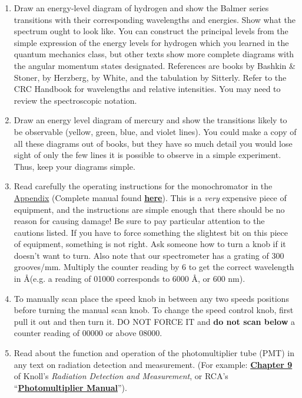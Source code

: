 \documentclass{../lab}
\begin{document}
\begin{enumerate}
    \item Draw an energy-level diagram of hydrogen and show the Balmer series transitions with their corresponding wavelengths and energies. Show what the spectrum ought to look like. You can construct the principal levels from the simple expression of the energy levels for hydrogen which you learned in the quantum mechanics class, but other texts show more complete diagrams with the angular momentum states designated. References are books by Bashkin \& Stoner, by Herzberg, by White, and the tabulation by Sitterly. Refer to the CRC Handbook for wavelengths and relative intensities. You may need to review the spectroscopic notation.

    \item Draw an energy level diagram of mercury and show the transitions likely to be observable (yellow, green, blue, and violet lines).
	You could make a copy of all these diagrams out of books, but they have so much detail you would lose sight of only the few lines it is possible to observe in a simple experiment. Thus, keep your diagrams simple.

    \item Read carefully the operating instructions for the monochromator in the \hyperref[sec:Appendix]{ Appendix}
    (Complete manual found \href{https://drive.google.com/file/d/1qrGTtcw9cd7z8blat9n5xlo_y_Rtyrm6/view?usp=drive_link}{\textbf{here}}). This is a \emph{very} expensive piece of equipment, and the instructions are simple enough that there should be no reason for causing damage! Be sure to pay particular attention to the cautions listed. If you have to force something the slightest bit on this piece of equipment, something is not right. Ask someone how to turn a knob if it doesn't want to turn. Also note that our spectrometer has a grating of 300 grooves/mm. Multiply the counter reading by 6 to get the correct wavelength in \AA (e.g. a reading of 01000 corresponds to 6000 \AA, or 600 nm).

    \item To manually scan place the speed knob in between any two speeds positions before turning the manual scan knob. To change the speed control knob, first pull it out and then turn it. DO NOT FORCE IT and \textbf{do not scan below} a counter reading of 00000 or above 08000.

    \item Read about the function and operation of the photomultiplier tube (PMT) in any text on radiation detection and measurement. (For example:  \href{https://drive.google.com/file/d/1SoVP6jmWYZIQK9NuvwGr-_TFffYuJ3Q4/view?usp=drive_link} {\textbf{Chapter 9}} of Knoll's \emph{Radiation Detection and Measurement}, or RCA's ``\href{https://drive.google.com/file/d/1zl5AXXw_uViqj6ClDXjI6Z9R3JVtE-T5/view?usp=drive_link}{\textbf{Photomultiplier Manual}}'').
    

\end{enumerate}
\end{document}
